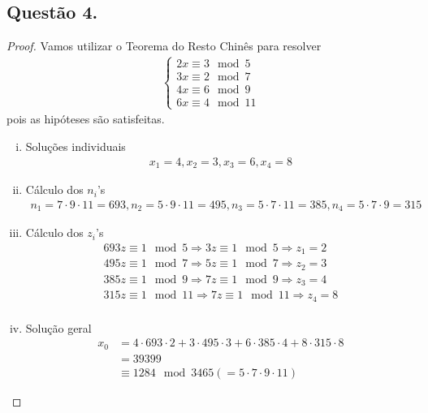 \documentclass[a4paper,12pt]{article}
\theoremstyle{definition}
\begin{document}
	\subsection*{Questão 4.}
	\begin{proof}
		Vamos utilizar o Teorema do Resto Chinês para resolver
		\begin{align*}
		\begin{cases}
		2x\equiv 3\mod 5 \\
		3x\equiv 2\mod 7 \\
		4x\equiv 6\mod 9 \\
		6x\equiv 4\mod 11
		\end{cases}
		\end{align*} 
		pois as hipóteses são satisfeitas.
		\begin{enumerate}[(i)]
			\item Soluções individuais
			\begin{align*}
			x_1 = 4, x_2 = 3, x_3 = 6, x_4 = 8
			\end{align*}
			\item Cálculo dos $n_i$'s
			\begin{align*}
			n_1 = 7\cdot 9\cdot 11 = 693, n_2 = 5\cdot 9\cdot 11 = 495, n_3 = 5\cdot 7\cdot 11 = 385, n_4 = 5\cdot 7\cdot 9 = 315
			\end{align*}
			\item Cálculo dos $z_i$'s
			\begin{align*}
			693z\equiv 1\mod 5 \Rightarrow 3z\equiv 1\mod 5 \Rightarrow z_1 = 2 \\
			495z\equiv 1\mod 7 \Rightarrow 5z\equiv 1\mod 7 \Rightarrow z_2 = 3 \\
			385z\equiv 1\mod 9 \Rightarrow 7z\equiv 1\mod 9 \Rightarrow z_3 = 4 \\
			315z\equiv 1\mod 11 \Rightarrow 7z\equiv 1\mod 11 \Rightarrow z_4 = 8 \\
			\end{align*}
			\item Solução geral
			\begin{align*}
			x_0 &= 4\cdot 693\cdot 2 + 3\cdot 495\cdot 3 + 6\cdot 385\cdot 4 + 8\cdot 315\cdot 8 \\
			&= 39399 \\
			&\equiv 1284\mod 3465 (= 5\cdot 7\cdot 9\cdot 11)
			\end{align*}
		\end{enumerate}
	\end{proof}
\end{document}
